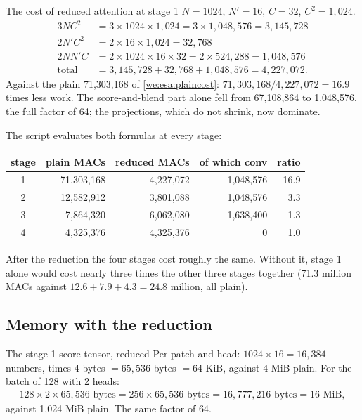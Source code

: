 \begin{worked}[label={we:esa:redcost}]{The cost of reduced attention at stage 1}
$N = 1024$, $N' = 16$, $C = 32$, $C^2 = 1{,}024$.
\begin{align*}
  3NC^2 &= 3\times1024\times1{,}024 = 3\times1{,}048{,}576 = 3{,}145{,}728\\
  2N'C^2 &= 2\times16\times1{,}024 = 32{,}768\\
  2NN'C &= 2\times1024\times16\times32 = 2\times524{,}288 = 1{,}048{,}576\\
  \text{total} &= 3{,}145{,}728 + 32{,}768 + 1{,}048{,}576 = 4{,}227{,}072 .
\end{align*}
Against the plain 71{,}303{,}168 of \cref{we:esa:plaincost}:
$71{,}303{,}168 / 4{,}227{,}072 = 16.9$ times less work. The score-and-blend part alone fell from
67{,}108{,}864 to 1{,}048{,}576, the full factor of 64; the projections, which do not shrink,
now dominate.
\end{worked}

The script evaluates both formulas at every stage\tagC:
\begin{center}
\begin{tabular}{crrrr}
\toprule
stage & plain MACs & reduced MACs & of which conv & ratio\\
\midrule
1 & 71{,}303{,}168 & 4{,}227{,}072 & 1{,}048{,}576 & 16.9\\
2 & 12{,}582{,}912 & 3{,}801{,}088 & 1{,}048{,}576 & 3.3\\
3 & 7{,}864{,}320 & 6{,}062{,}080 & 1{,}638{,}400 & 1.3\\
4 & 4{,}325{,}376 & 4{,}325{,}376 & 0 & 1.0\\
\bottomrule
\end{tabular}
\end{center}
After the reduction the four stages cost roughly the same. Without it, stage 1 alone would cost
nearly three times the other three stages together (71.3 million MACs against
$12.6 + 7.9 + 4.3 = 24.8$ million, all plain).

\subsection{Memory with the reduction}

\begin{worked}[label={we:esa:redmem}]{The stage-1 score tensor, reduced}
Per patch and head: $1024\times16 = 16{,}384$ numbers, times 4 bytes $= 65{,}536$ bytes
$= 64$ KiB, against 4 MiB plain. For the batch of 128 with 2 heads:
\begin{align*}
  128\times2\times65{,}536 \text{ bytes} = 256\times65{,}536 \text{ bytes} = 16{,}777{,}216 \text{ bytes} = 16 \text{ MiB},
\end{align*}
against 1{,}024 MiB plain. The same factor of 64.
\end{worked}

